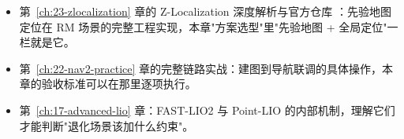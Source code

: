 \begin{reading}

\begin{itemize}
  \item 第~\ref{ch:23-zlocalization} 章的 Z-Localization 深度解析与官方仓库 \cite{zloc2026}：先验地图定位在 RM 场景的完整工程实现，本章"方案选型"里"先验地图 + 全局定位"一栏就是它。
  \item 第~\ref{ch:22-nav2-practice} 章的完整链路实战：建图到导航联调的具体操作，本章的验收标准可以在那里逐项执行。
  \item 第~\ref{ch:17-advanced-lio} 章：FAST-LIO2 与 Point-LIO 的内部机制，理解它们才能判断"退化场景该加什么约束"。
\end{itemize}


\end{reading}
